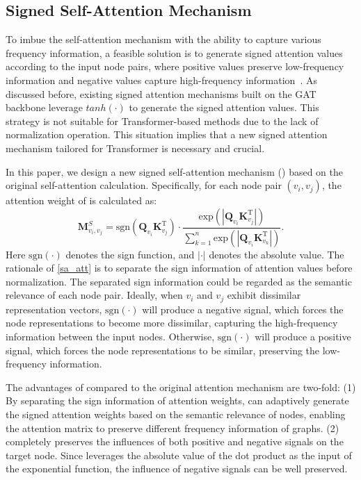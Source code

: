 \documentclass[sigconf, screen]{acmart}
\begin{document}
\subsection{Signed Self-Attention Mechanism}
To imbue the self-attention mechanism with the ability to capture various frequency information, a feasible solution is to generate signed attention values according to the input node pairs, where positive values preserve low-frequency information and negative values capture high-frequency information~\cite{fagcn}.
As discussed before, existing signed attention mechanisms built on the GAT backbone leverage $\mathit{tanh}(\cdot)$ to generate the signed attention values.
This strategy is not suitable for Transformer-based methods due to the lack of normalization operation.
This situation implies that a new signed attention mechanism tailored for Transformer is necessary and crucial.

In this paper, we design a new signed self-attention mechanism (\saname) based on the original self-attention calculation.
Specifically, for each node pair $(v_i, v_j)$, the attention weight of \saname is calculated as:
\begin{equation}
    \mathbf{M}^{S}_{v_i, v_j} = \mathrm{sgn}(\mathbf{Q}_{v_i}\mathbf{K}_{v_j}^{\mathrm{T}}) \cdot
    \frac{\mathrm{exp}(|\mathbf{Q}_{v_i}
    \mathbf{K}_{v_j}^{\mathrm{T}}|)}
    {\sum_{k=1}^{n}\mathrm{exp}(|\mathbf{Q}_{v_i}
    \mathbf{K}_{v_k}^{\mathrm{T}}|)}.    
    \label{sa_att}
\end{equation}
Here $\mathrm{sgn}(\cdot)$ denotes the sign function, and 
$|\cdot|$ denotes the absolute value.
The rationale of \autoref{sa_att} is to separate the sign information of attention values before normalization.
The separated sign information could be regarded as the semantic relevance of each node pair.
Ideally, when $v_i$ and $v_j$ exhibit dissimilar representation vectors, $\mathrm{sgn}(\cdot)$ will produce a negative signal, which forces the node representations to become more dissimilar, capturing the high-frequency information between the input nodes.
Otherwise, $\mathrm{sgn}(\cdot)$ will produce a positive signal, which forces the node representations to be similar, preserving the low-frequency information.

The advantages of \saname compared to the original attention mechanism are two-fold:
(1) By separating the sign information of attention weights, \saname can adaptively generate the signed attention weights based on the semantic relevance of nodes, enabling the attention matrix to preserve different frequency information of graphs. 
(2) \saname completely preserves the influences of both positive and negative signals on the target node.
Since \saname leverages the absolute value of the dot product as the input of the exponential function, the influence of negative signals can be well preserved.
\end{document}
